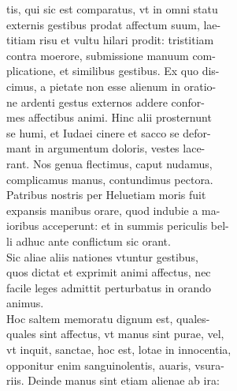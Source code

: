 \documentclass{article}
\begin{document}
\begin{pages}
                tis, qui sic est comparatus, vt in omni statu \\
                externis gestibus prodat affectum suum, lae- \\
                titiam risu et vultu hilari prodit: tristitiam \\
                contra moerore, submissione manuum com- \\
                plicatione, et similibus gestibus. Ex quo dis- \\
                cimus, a pietate non esse alienum in oratio- \\
                ne ardenti gestus externos addere confor- \\
                mes affectibus animi. Hinc alii prosternunt \\
                se humi, et Iudaei cinere et sacco se defor- \\
                mant in argumentum doloris, vestes lace- \\
                rant. Nos genua flectimus, caput nudamus, \\
                complicamus manus, contundimus pectora. \\
                Patribus nostris per Heluetiam moris fuit \\
                expansis manibus orare, quod indubie a ma- \\
                ioribus acceperunt: et in summis periculis bel- \\
                li adhuc ante conflictum sic orant. \\
                Sic aliae aliis nationes vtuntur gestibus, \\
                quos dictat et exprimit animi affectus, nec \\
                facile leges admittit perturbatus in orando \\
                animus. \\
                Hoc saltem memoratu dignum est, quales- \\
                quales sint affectus, vt manus sint purae, vel, \\
                vt inquit, sanctae, hoc est, lotae in innocentia, \\
                opponitur enim sanguinolentis, auaris, vsura- \\
                riis. Deinde manus sint etiam alienae ab ira: \\
\end{pages}
\end{document}
